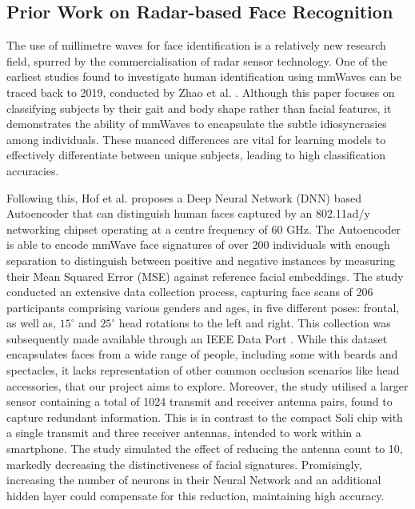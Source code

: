 \documentclass{interim}
\begin{document}
\subsection{Prior Work on Radar-based Face Recognition}
\label{background:prior_work}
The use of millimetre waves for face identification is a relatively new research field, spurred by the commercialisation of radar sensor technology. One of the earliest studies found to investigate human identification using mmWaves can be traced back to 2019, conducted by Zhao et al. \cite{zhao2019mid}. Although this paper focuses on classifying subjects by their gait and body shape rather than facial features, it demonstrates the ability of mmWaves to encapsulate the subtle idiosyncrasies among individuals. These nuanced differences are vital for learning models to effectively differentiate between unique subjects, leading to high classification accuracies.

Following this, Hof et al. \cite{hof2020face} proposes a Deep Neural Network (DNN) based Autoencoder that can distinguish human faces captured by an 802.11ad/y networking chipset operating at a centre frequency of 60 GHz. The Autoencoder is able to encode mmWave face signatures of over 200 individuals with enough separation to distinguish between positive and negative instances by measuring their Mean Squared Error (MSE) against reference facial embeddings. The study conducted an extensive data collection process, capturing face scans of 206 participants comprising various genders and ages, in five different poses: frontal, as well as, $15^\circ$ and $25^\circ$ head rotations to the left and right. This collection was subsequently made available through an IEEE Data Port \cite{mmwavefacedata}. While this dataset encapsulates faces from a wide range of people, including some with beards and spectacles, it lacks representation of other common occlusion scenarios like head accessories, that our project aims to explore. Moreover, the study utilised a larger sensor containing a total of 1024 transmit and receiver antenna pairs, found to capture redundant information. This is in contrast to the compact Soli chip with a single transmit and three receiver antennas, intended to work within a smartphone. The study simulated the effect of reducing the antenna count to 10, markedly decreasing the distinctiveness of facial signatures. Promisingly, increasing the number of neurons in their Neural Network and an additional hidden layer could compensate for this reduction, maintaining high accuracy.
\end{document}
